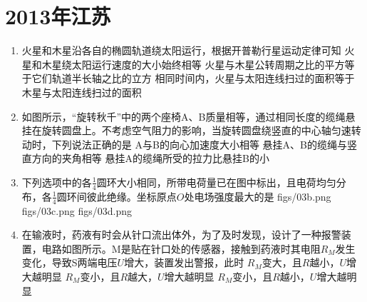 \documentclass[\gkver]{gaokaozhenti}
\begin{document}
\chapter{2013年江苏}

\begin{enumerate}
\item
火星和木星沿各自的椭圆轨道绕太阳运行，根据开普勒行星运动定律可知
{火星和木星绕太阳运行速度的大小始终相等}
{火星与木星公转周期之比的平方等于它们轨道半长轴之比的立方}
{相同时间内，火星与太阳连线扫过的面积等于木星与太阳连线扫过的面积}

\item
如图所示，“旋转秋千”中的两个座椅A、B质量相等，通过相同长度的缆绳悬挂在旋转圆盘上。不考虑空气阻力的影响，当旋转圆盘绕竖直的中心轴匀速转动时，下列说法正确的是
{A与B的向心加速度大小相等}
{悬挂A、B的缆绳与竖直方向的夹角相等}
{悬挂A的缆绳所受的拉力比悬挂B的小}

\item
下列选项中的各$\frac{1}{4}$圆环大小相同，所带电荷量已在图中标出，且电荷均匀分布，各$\frac{1}{4}$圆环间彼此绝缘。坐标原点$O$处电场强度最大的是
{figs/03b.png}
{figs/03c.png}
{figs/03d.png}

\item
在输液时，药液有时会从针口流出体外，为了及时发现，设计了一种报警装置，电路如图所示。M是贴在针口处的传感器，接触到药液时其电阻$R_{M}$发生变化，导致S两端电压$U$增大，装置发出警报，此时
{$R_{M}$变大，且$R$越小，$U$增大越明显}
{$R_{M}$变小，且$R$越大，$U$增大越明显}
{$R_{M}$变小，且$R$越小，$U$增大越明显}
\end{enumerate}
\end{document}
